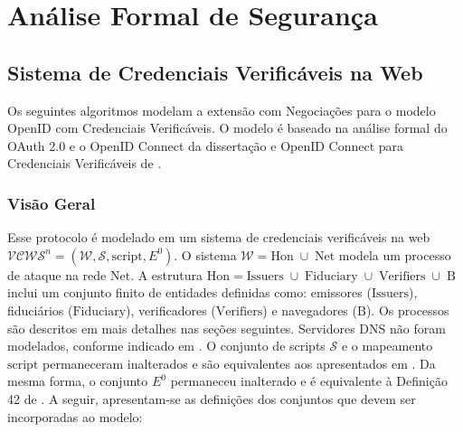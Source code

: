 \chapter{Análise Formal de Segurança}\label{appendice:formal-analysis}

\section{Sistema de Credenciais Verificáveis na Web}
Os seguintes algoritmos modelam a extensão com Negociações para o modelo OpenID com Credenciais Verificáveis. O modelo é baseado na análise formal do OAuth 2.0 e o OpenID Connect da dissertação  e OpenID Connect para Credenciais Verificáveis de . 

\subsection{Visão Geral}
Esse protocolo é modelado em um sistema de credenciais verificáveis na web $ \mathcal{VCWS}^n = (\mathcal{W}, \mathcal{S}, \text{script}, E^0) $.
O sistema $\mathcal{W} = \text{Hon} \; \cup \; \text{Net}$ modela um processo de ataque na rede $\text{Net}$. A estrutura $\text{Hon} = \text{Issuers} \; \cup \; \text{Fiduciary} \; \cup \; \text{Verifiers} \; \cup \; \text{B}$ inclui um conjunto finito de entidades definidas como: emissores ($\text{Issuers}$), fiduciários ($\text{Fiduciary}$), verificadores ($\text{Verifiers}$) e navegadores ($\text{B}$).
Os processos são descritos em mais detalhes nas seções seguintes. Servidores DNS não foram modelados, conforme indicado em \cite{hauck2023openid}. O conjunto de scripts $\mathcal{S}$ e o mapeamento $\text{script}$ permaneceram inalterados e são equivalentes aos apresentados em \cite[Seções A.1]{hauck2023openid}. Da mesma forma, o conjunto $E^0$ permaneceu inalterado e é equivalente à Definição 42 de \cite{FettKS14}.
A seguir, apresentam-se as definições dos conjuntos que devem ser incorporadas ao modelo:

